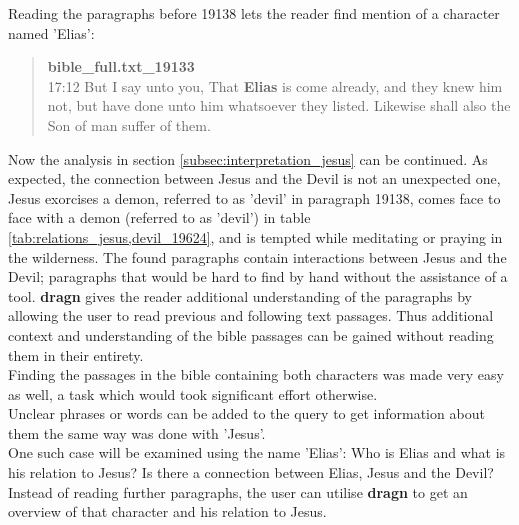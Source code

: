 Reading the paragraphs before 19138 lets the reader find mention of a character named 'Elias':
\blockquote{
\textbf{bible\_full.txt\_19133}\\
17:12 But I say unto you, That \textbf{Elias} is come already, and they knew him not, but have done unto him whatsoever they listed. Likewise shall also the Son of man suffer of them.}
Now the analysis in section \ref{subsec:interpretation_jesus} can be continued. As expected, the connection between Jesus and the Devil is not an unexpected one, Jesus exorcises a demon, referred to as 'devil' in paragraph 19138, comes face to face with a demon (referred to as 'devil') in table \ref{tab:relations_jesus,devil_19624}, and is tempted while meditating or praying in the wilderness. The found paragraphs contain interactions between Jesus and the Devil; paragraphs that would be hard to find by hand without the assistance of a tool. \textbf{dragn} gives the reader additional understanding of the paragraphs by allowing the user to read previous and following text passages. Thus additional context and understanding of the bible passages can be gained without reading them in their entirety.\\
Finding the passages in the bible containing both characters was made very easy as well, a task which would took significant effort otherwise.\\
Unclear phrases or words can be added to the query to get information about them the same way was done with 'Jesus'.\\
One such case will be examined using the name 'Elias': Who is Elias and what is his relation to Jesus? Is there a connection between Elias, Jesus and the Devil? Instead of reading further paragraphs, the user can utilise \textbf{dragn} to get an overview of that character and his relation to Jesus.

%
%
%
%
\clearpage
